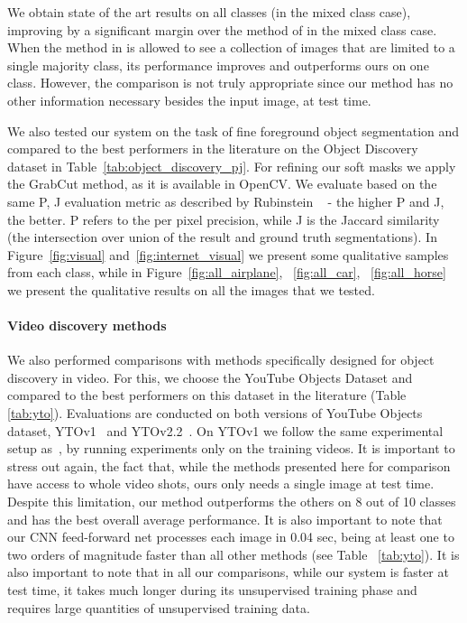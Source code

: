 \documentclass[10pt,twocolumn,letterpaper]{article}
\begin{document}
We obtain state of the art
results on all classes (in the mixed class case), improving by a significant margin over the method of \cite{cho2015unsupervised} in the mixed class case. When the method in \cite{cho2015unsupervised} is allowed to see a collection of images that are limited to a single majority class, its performance improves and outperforms ours on one class. However, the comparison is not truly appropriate since our method has no other information necessary besides the input image, at test time.

We also tested our system on the task of fine foreground object segmentation and compared to the best performers in the literature on the Object Discovery dataset in Table~\ref{tab:object_discovery_pj}. For refining our soft masks we apply the GrabCut method, as it is available in OpenCV. We evaluate based on the same
P, J evaluation metric as described by Rubinstein \etal ~\cite{rubinstein2013unsupervised} - the higher P and J, the better. P refers to the per pixel precision, while J is the Jaccard similarity (the intersection over
union of the result and ground truth segmentations). In Figure~\ref{fig:visual} and~\ref{fig:internet_visual} we present some qualitative samples from each class, while in Figure~\ref{fig:all_airplane}, ~\ref{fig:all_car}, ~\ref{fig:all_horse} we present the qualitative results on all the images that we tested.

\paragraph{Video discovery methods} 

We also performed comparisons with methods specifically designed for object discovery in video. For this, we choose the YouTube Objects Dataset and compared to the best performers on this dataset in the literature (Table \ref{tab:yto}). Evaluations are conducted on both 
versions of YouTube Objects dataset,
YTOv1~\cite{prest2012learning} and YTOv2.2~\cite{kalogeiton2016analysing}. On YTOv1 we follow the same experimental setup as~\cite{jun2016pod, prest2012learning}, by running experiments only on the training videos. It is important to stress out again, the fact that, while the methods presented here for comparison have access to whole video shots, ours only needs a single image at test time. Despite this limitation, our method outperforms the others on 8 out of 10 classes and has the best overall average performance. It is also important to note that our CNN feed-forward net processes each image in 0.04 sec, being at least one to two orders of magnitude faster than all other methods (see Table ~\ref{tab:yto}). It is also important to note that in all our comparisons, while our system is faster at test time, it takes much longer during its unsupervised training phase and requires large quantities of unsupervised training data.
\end{document}
